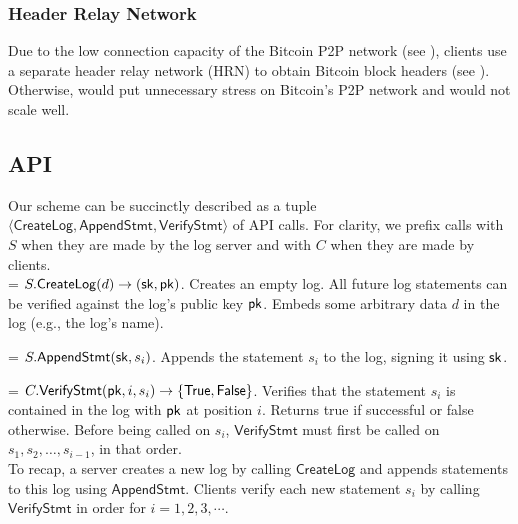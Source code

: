 \subsubsection{Header Relay Network}
Due to the low connection capacity of the Bitcoin P2P network (see ), \Sys clients use a separate header relay network (HRN) to obtain Bitcoin block headers (see ).
Otherwise, \Sys would put unnecessary stress on Bitcoin's P2P network and would not scale well.

\newcommand{\api}{\hangindent=\parindent \hangafter=1 \noindent}
\newcommand{\createlog}{\mathsf{CreateLog}\xspace}
\newcommand{\appendstmt}{\mathsf{AppendStmt}\xspace}
\newcommand{\verifystmt}{\mathsf{VerifyStmt}\xspace}
\newcommand{\txgen}{\mathsf{tx}_{\textsf{genesis}}}

\subsection{\Sys API}
\label{sec:model:api}

Our scheme can be succinctly described as a tuple $\langle \createlog, \appendstmt, \verifystmt \rangle$ of API calls.
For clarity, we prefix calls with $S$ when they are made by the log server and with $C$ when they are made by clients.
\\

\api $S.\createlog(d) \rightarrow (\sK, \pK)$.
Creates an empty log. 
All future log statements can be verified against the log's public key $\mathsf{pk}$.
Embeds some arbitrary data $d$ in the log (e.g., the log's name).

\api $S.\appendstmt(\sK, s_i)$.
Appends the statement $s_i$ to the log, signing it using $\mathsf{sk}$.

\api $C.\verifystmt(\pK, i, s_i) \rightarrow \{\mathsf{True, False}\}$.
Verifies that the statement $s_i$ is contained in the log with \pk $\mathsf{pk}$ at position $i$.
Returns true if successful or false otherwise.
Before being called on $s_i$, $\verifystmt$ must first be called on $s_1, s_2, \dots, s_{i-1}$, in that order.
\\

To recap, a server creates a new log by calling $\createlog$ and appends statements to this log using $\appendstmt$.
Clients verify each new statement $s_i$ by calling $\verifystmt$ in order for $i = 1, 2, 3, \cdots$.

